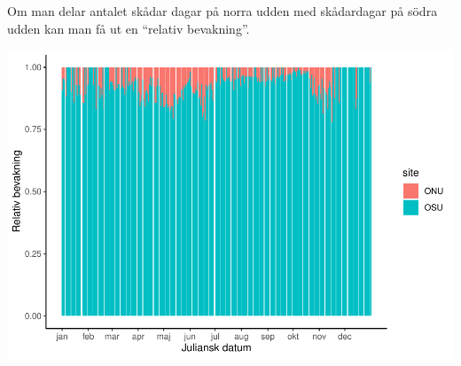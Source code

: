 \documentclass[
]{book}
\begin{document}
Om man delar antalet skådar dagar på norra udden med skådardagar på södra udden kan man få ut en ``relativ bevakning''.

\includegraphics{_main_files/figure-latex/unnamed-chunk-4-1.pdf}

  
\end{document}
